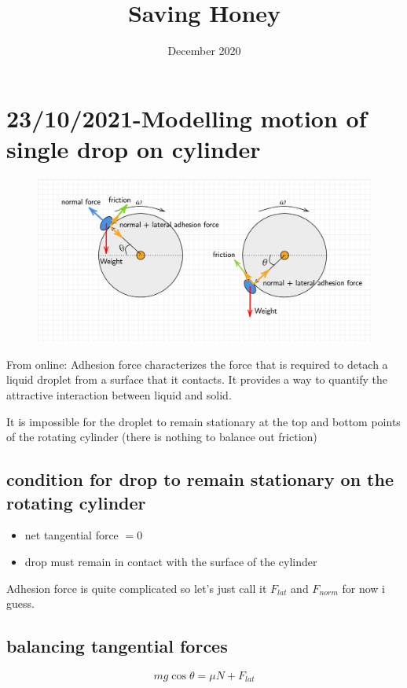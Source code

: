 \documentclass{scrartcl}
\begin{document}
\title{Saving Honey}
\author{}
\date{December 2020}
\setlength\parindent{0pt}


\maketitle

\section{23/10/2021-Modelling motion of single drop on cylinder}
\begin{figure}[h]
    \includegraphics[width=\textwidth]{diagram-20211030.png}
\end{figure}

From online: Adhesion force characterizes the force that is required to detach a liquid droplet from a surface that it contacts. It provides a way to quantify the attractive interaction between liquid and solid.

It is impossible for the droplet to remain stationary at the top and bottom points of the rotating cylinder (there is nothing to balance out friction)

\subsection{condition for drop to remain stationary on the rotating cylinder}
\begin{itemize}
    \item net tangential force $=0$
    \item drop must remain in contact with the surface of the cylinder
\end{itemize}

Adhesion force is quite complicated so let's just call it $F_{lat}$ and $F_{norm}$ for now i guess.

\subsection{balancing tangential forces}
\begin{equation}
    mg\cos\theta=\mu N + F_{lat}
\end{equation}
\end{document}
